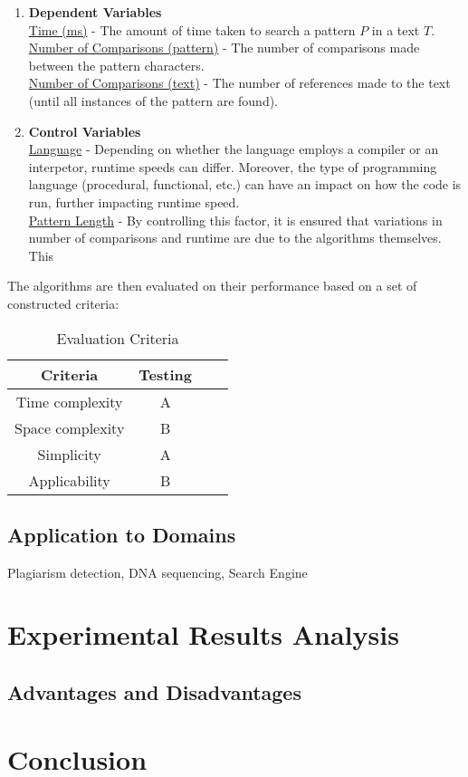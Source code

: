 \documentclass[12pt]{article}
\begin{document}
\begin{enumerate}
	\item \textbf{Dependent Variables} \\
	\underline{Time (ms)} - The amount of time taken to search a pattern $P$ in a text $T$. \\
	\underline{Number of Comparisons (pattern)} - The number of comparisons made between the pattern characters. \\
	\underline{Number of Comparisons (text)} - The number of references made to the text (until all instances of the pattern are found).
	\item \textbf{Control Variables} \\
	\underline{Language} - Depending on whether the language employs a compiler or an interpetor, runtime speeds can differ. Moreover, the type of programming language (procedural, functional, etc.) can have an impact on how the code is run, further impacting runtime speed.\\
	\underline{Pattern Length} - By controlling this factor, it is ensured that variations in number of comparisons and runtime are due to the algorithms themselves. This 
\end{enumerate}

The algorithms are then evaluated on their performance based on a set of constructed criteria:

\begin{table}[!htbp]
    \centering
    \begin{tabular}{|c|c|c|c|}
        \hline
        Criteria & Testing \\
        \hline
        Time complexity & A \\
        Space complexity & B \\
        Simplicity & A \\
        Applicability & B \\
        \hline
    \end{tabular}
    \caption{Evaluation Criteria}
\end{table}

\subsection{Application to Domains}
Plagiarism detection, DNA sequencing, Search Engine

\section{Experimental Results Analysis}
\subsection{Advantages and Disadvantages}

\section{Conclusion}

\printbibliography
\end{document}
